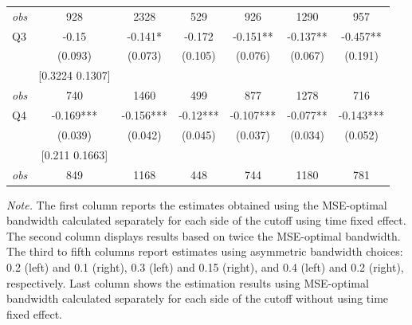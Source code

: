 \begin{table}[]
{\begin{tabular}{lcccccc}
\textit{obs} & 928 & 2328 & 529 & 926 & 1290 & 957 \\ 
Q3 & -0.15 & -0.141* & -0.172 & -0.151** & -0.137** & -0.457** \\ 
&(0.093)&(0.073) & (0.105)&(0.076)&(0.067)&(0.191)\\ 
& [0.3224 0.1307] & & & & & \\ 
\textit{obs} & 740 & 1460 & 499 & 877 & 1278 & 716 \\ 
Q4 & -0.169*** & -0.156*** & -0.12*** & -0.107*** & -0.077** & -0.143*** \\ 
&(0.039)&(0.042) & (0.045)&(0.037)&(0.034)&(0.052)\\ 
& [0.211 0.1663] & & & & & \\ 
\textit{obs} & 849 & 1168 & 448 & 744 & 1180 & 781 \\ 
\hline 
\end{tabular}}{\textit{Note.} The first column reports the estimates obtained using the MSE-optimal bandwidth calculated separately for each side of the cutoff using time fixed effect. The second column displays results based on twice the MSE-optimal bandwidth. The third to fifth columns report estimates using asymmetric bandwidth choices: 0.2 (left) and 0.1 (right), 0.3 (left) and 0.15 (right), and 0.4 (left) and 0.2 (right), respectively. Last column shows the estimation results using MSE-optimal bandwidth calculated separately for each side of the cutoff without using time fixed effect.}
\end{table}

